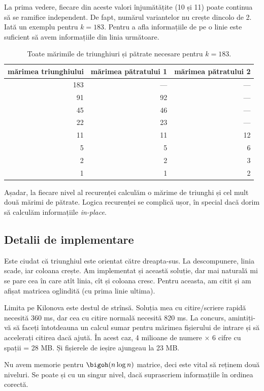 La prima vedere, fiecare din aceste valori înjumătățite (10 și 11) poate continua să se ramifice independent. De fapt, numărul variantelor nu crește dincolo de 2. Iată un exemplu pentru $k = 183$. Pentru a afla informațiile de pe o linie este suficient să avem informațiile din linia următoare.

\begin{table}[H]
  \centering
  \begin{tabular}{rrr}
    mărimea triunghiului & mărimea pătratului 1 & mărimea pătratului 2\\
    \hline
    183 & --- & --- \\
    91 & 92 & --- \\
    45 & 46 & --- \\
    22 & 23 & --- \\
    11 & 11 & 12 \\
    5 & 5 & 6 \\
    2 & 2 & 3 \\
    1 & 1 & 2 \\
    \hline
  \end{tabular}

  \caption{Toate mărimile de triunghiuri și pătrate necesare pentru $k=183$.}
\end{table}

Așadar, la fiecare nivel al recurenței calculăm o mărime de triunghi și cel mult două mărimi de pătrate. Logica recurenței se complică ușor, în special dacă dorim să calculăm informațiile \textit{in-place}.

\subsection{Detalii de implementare}

Este ciudat că triunghiul este orientat către dreapta-sus. La descompunere, linia scade, iar coloana crește. Am implementat și această soluție, dar mai naturală mi se pare cea în care atît linia, cît și coloana cresc. Pentru aceasta, am citit și am afișat matricea oglindită (cu prima linie ultima).

Limita pe Kilonova este destul de strînsă. Soluția mea cu citire/scriere rapidă necesită 360 ms, dar cea cu citire normală necesită 820 ms. La concurs, amintiți-vă să faceți întotdeauna un calcul sumar pentru mărimea fișierului de intrare și să accelerați citirea dacă ajută. În acest caz, 4 milioane de numere × 6 cifre cu spații = 28 MB. Și fișierele de ieșire ajungeau la 23 MB.

Nu avem memorie pentru $\bigoh(n \log n)$ matrice, deci este vital să reținem două niveluri. Se poate și cu un singur nivel, dacă suprascriem informațiile în ordinea corectă.

